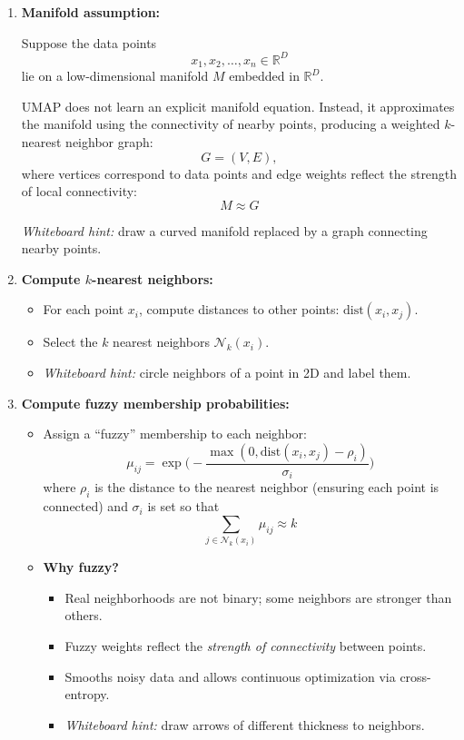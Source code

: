 \documentclass{article}
\begin{document}
\begin{enumerate}

\item \textbf{Manifold assumption:}

Suppose the data points
\[
x_1, x_2, \dots, x_n \in \mathbb{R}^D
\]
lie on a low-dimensional manifold $M$ embedded in $\mathbb{R}^D$.

UMAP does not learn an explicit manifold equation. Instead, it approximates the manifold using the connectivity of nearby points, producing a weighted $k$-nearest neighbor graph:
\[
G = (V,E),
\]
where vertices correspond to data points and edge weights reflect the strength of local connectivity:
\[
M \approx G
\]

\emph{Whiteboard hint:} draw a curved manifold replaced by a graph connecting nearby points.

\item \textbf{Compute $k$-nearest neighbors:}  
\begin{itemize}
    \item For each point $x_i$, compute distances to other points: $\text{dist}(x_i, x_j)$.
    \item Select the $k$ nearest neighbors $\mathcal{N}_k(x_i)$.
    \item \emph{Whiteboard hint:} circle neighbors of a point in 2D and label them.
\end{itemize}

\item \textbf{Compute fuzzy membership probabilities:}  
\begin{itemize}
    \item Assign a “fuzzy” membership to each neighbor:
    \[
    \mu_{ij} = \exp\Big(- \frac{\max(0, \text{dist}(x_i, x_j) - \rho_i)}{\sigma_i}\Big)
    \]
    where $\rho_i$ is the distance to the nearest neighbor (ensuring each point is connected) and $\sigma_i$ is set so that
    \[
    \sum_{j \in \mathcal{N}_k(x_i)} \mu_{ij} \approx k
    \]
    \item \textbf{Why fuzzy?}  
    \begin{itemize}
        \item Real neighborhoods are not binary; some neighbors are stronger than others.
        \item Fuzzy weights reflect the \emph{strength of connectivity} between points.
        \item Smooths noisy data and allows continuous optimization via cross-entropy.
        \item \emph{Whiteboard hint:} draw arrows of different thickness to neighbors.
    \end{itemize}
\end{itemize}


\end{enumerate}
\end{document}
